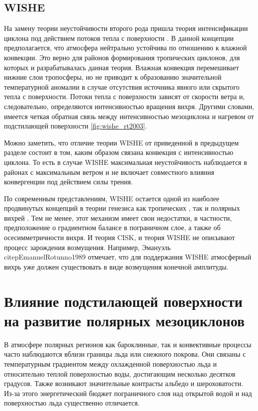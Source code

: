\documentclass[12pt,a4paper]{report}
\begin{document}
\subsection{WISHE}
На замену теории неустойчивости второго рода пришла теория интенсификации циклона под действием потоков тепла с поверхности \citep{EmanuelRotunno1989}. В данной концепции предполагается, что атмосфера нейтрально устойчива по отношению к влажной конвекции. Это верно для районов формирования тропических циклонов, для которых и разрабатывалась данная теория. Влажная конвекция перемешивает нижние слои тропосферы, но не приводит к образованию значительной температурной аномалии в случае отсутствия источника явного или скрытого тепла с поверхности. Потоки тепла с поверхности зависят от скорости ветра и, следовательно, определяются интенсивностью вращения вихря. Другими словами, имеется четкая обратная связь между интенсивностью мезоциклона и нагревом от подстилающей поверхности \ref{fig:wishe_rt2003}.

Можно заметить, что отличие теории WISHE от приведенной в предыдущем разделе состоит в том, каким образом связана конвекция с интенсивностью циклона. То есть в случае WISHE максимальная неустойчивость наблюдается в районах с максимальным ветром и не включает совместного влияния конвергенции под действием силы трения.

По современным представлениям, WISHE остается одной из наиболее продвинутых концепций в теории генезиса как тропических \citep{CraigGray1996}, так и полярных вихрей \citep{EmanuelRotunno1989}. Тем не менее, этот механизм имеет свои недостатки, в частности, предположение о градиентном балансе в пограничном слое, а также об осесимметричности вихря. И теория CISK, и теория WISHE не описывают процесс зарождения возмущения. Например, Эмануэль citep{EmanuelRotunno1989} отмечает, что для поддержания WISHE атмосферный вихрь уже должен существовать в виде возмущения конечной амплитуды.

\section{Влияние подстилающей поверхности на развитие полярных мезоциклонов}
В атмосфере полярных регионов как бароклинные, так и конвективные процессы часто наблюдаются вблизи границы льда или снежного покрова. Они связаны с температурным градиентом между охлажденной поверхностью льда и относительно теплой поверхностью воды, достигающим несколько десятков градусов. Также возникают значительные контрасты альбедо и шероховатости. Из-за этого энергетический бюджет пограничного слоя над открытой водой и над поверхностью льда существенно отличается.
\end{document}
